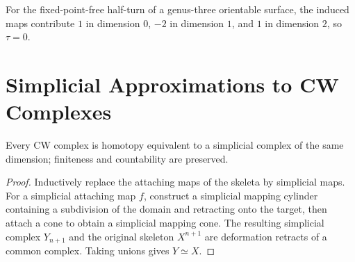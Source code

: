 \begin{example}
\label{ex:lefschetz-surface-rotation}
For the fixed-point-free half-turn of a genus-three orientable surface, the induced maps contribute $1$ in dimension $0$, $-2$ in dimension $1$, and $1$ in dimension $2$, so $\tau=0$.
\end{example}

\section{Simplicial Approximations to CW Complexes}

\begin{theorem}
\label{thm:cw-homotopy-equivalent-simplicial}
Every CW complex is homotopy equivalent to a simplicial complex of the same dimension; finiteness and countability are preserved.
\end{theorem}
\begin{proof}
\sketch Inductively replace the attaching maps of the skeleta by simplicial maps.  For a simplicial attaching map $f$, construct a simplicial mapping cylinder containing a subdivision of the domain and retracting onto the target, then attach a cone to obtain a simplicial mapping cone.  The resulting simplicial complex $Y_{n+1}$ and the original skeleton $X^{n+1}$ are deformation retracts of a common complex.  Taking unions gives $Y\simeq X$.
\end{proof}
